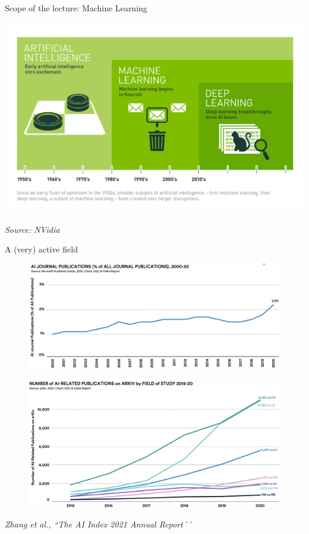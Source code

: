\documentclass[handout, 10pt]{beamer}
\newcommand{\rref}[1][]{\hfill{\scriptsize\textit{#1}}}
\begin{document}
\begin{frame}{Scope of the lecture: Machine Learning}
 \begin{center}
     \includegraphics[width=\textwidth]{fig/L1/Deep_Learning_Icons_R5_PNG.png}
 \end{center}
 \rref[Source: NVidia]
 \end{frame}
 \begin{frame}{A (very) active field}

\begin{figure}
\includegraphics[width=.6\textwidth]{fig/L1/progress-papers.png}
\end{figure}

\begin{figure}
\includegraphics[width=.6\textwidth]{fig/L1/progress-ml.png}
\end{figure}

  \rref[Zhang et al., ``The AI Index 2021 Annual Report´´]

\end{frame}
\end{document}
